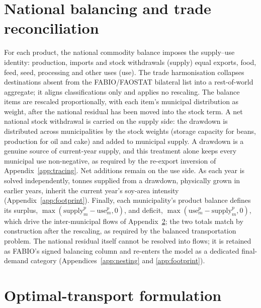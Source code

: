 \documentclass[pdflatex,sn-nature]{sn-jnl}%
\begin{document}
\section{National balancing and trade reconciliation}\label{app:balancing}
For each product, the national commodity balance imposes the supply--use
identity: production, imports and stock withdrawals (supply) equal
exports, food, feed, seed, processing and other uses (use). The trade
harmonisation collapses destinations absent from the FABIO/FAOSTAT
bilateral list into a rest-of-world aggregate; it aligns
classifications only and applies no rescaling. The balance items are
rescaled proportionally, with each item's municipal distribution as
weight, after the national residual has been moved into the stock
term. A net national stock withdrawal is carried on the supply side:
the drawdown is distributed across municipalities by the stock weights
(storage capacity for beans, production for oil and cake) and added to
municipal supply. A drawdown is a genuine source of current-year
supply, and this treatment alone keeps every municipal use
non-negative, as required by the re-export inversion of
Appendix~\ref{app:tracing}. Net additions remain on the use side. As
each year is solved independently, tonnes supplied from a drawdown,
physically grown in earlier years, inherit the current year's soy-area
intensity (Appendix~\ref{app:footprint}). Finally, each municipality's
product balance defines its surplus,
$\max(\text{supply}^p_m-\text{use}^p_m,0)$, and deficit,
$\max(\text{use}^p_m-\text{supply}^p_m,0)$, which drive the
inter-municipal flows of Appendix~\ref{app:transport}; the two totals
match by construction after the rescaling, as required by the balanced
transportation problem. The national residual itself cannot be
resolved into flows; it is retained as FABIO's signed balancing column
and re-enters the model as a dedicated final-demand category
(Appendices~\ref{app:nesting} and \ref{app:footprint}).

\section{Optimal-transport formulation}\label{app:transport}
\end{document}
